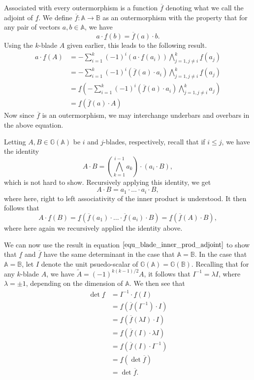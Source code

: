 \documentclass[12pt]{article}
\newcommand{\G}{\mathbb{G}}
\newcommand{\A}{\mathbb{A}}
\newcommand{\B}{\mathbb{B}}
\newcommand{\ob}{\overline}
\newcommand{\ub}{\underline}
\begin{document}
Associated with every outermorphism is a function $\ob{f}$ denoting what we call
the adjoint of $\ub{f}$.  We define $\ob{f}:\A\to\B$ as an outermorphism
with the property that for any pair of vectors $a,b\in\A$, we have
\begin{equation*}
a\cdot \ub{f}(b) = \ob{f}(a)\cdot b.
\end{equation*}
Using the $k$-blade $A$ given earlier, this leads to the following result.
\begin{align*}
a\cdot \ub{f}(A) &= -\sum_{i=1}^k(-1)^i(a\cdot\ub{f}(a_i))\bigwedge_{j=1,j\neq i}^k\ub{f}(a_j) \\
 &= -\sum_{i=1}^k(-1)^i(\ob{f}(a)\cdot a_i)\bigwedge_{j=1,j\neq i}^k\ub{f}(a_j) \\
 &= \ub{f}\left(-\sum_{i=1}^k(-1)^i(\ob{f}(a)\cdot a_i)\bigwedge_{j=1,j\neq i}^k a_j\right) \\
 &= \ub{f}(\ob{f}(a)\cdot A)
\end{align*}
Now since $\ob{f}$ is an outermorphism, we may interchange underbars and overbars
in the above equation.

Letting $A,B\in\G(\A)$ be $i$ and $j$-blades, respectively, recall that if $i\leq j$, we
have the identity
\begin{equation*}
A\cdot B = \left(\bigwedge_{k=1}^{i-1}a_k\right)\cdot(a_i\cdot B),
\end{equation*}
which is not hard to show.  Recursively applying this identity, we get
\begin{equation*}
A\cdot B = a_1\cdot\dots\cdot a_i\cdot B,
\end{equation*}
where here, right to left associativity of the inner product is understood.
It then follows that
\begin{equation}\label{equ_blade_inner_prod_adjoint}
A\cdot\ub{f}(B) = \ub{f}\left(\ob{f}(a_1)\cdot\dots\cdot\ob{f}(a_i)\cdot B\right) = \ub{f}(\ob{f}(A)\cdot B),
\end{equation}
where here again we recursively applied the identity above.

We can now use the
result in equation $\eqref{equ_blade_inner_prod_adjoint}$ to show that $\ub{f}$ and $\ob{f}$
have the same determinant in the case that $\A=\B$.  In the case that $\A=\B$, let $I$
denote the unit psuedo-scalar of $\G(\A)=\G(\B)$.  
Recalling that for any $k$-blade $A$, we have $\tilde{A}=(-1)^{k(k-1)/2}A$, it follows
that $I^{-1}=\lambda I$, where $\lambda = \pm 1$, depending on the dimension of $\A$.
We then see that
\begin{align*}
\det\ub{f} &= I^{-1}\cdot\ub{f}(I) \\
 &= \ub{f}(\ob{f}(I^{-1})\cdot I) \\
 &= \ub{f}(\ob{f}(\lambda I)\cdot I) \\
 &= \ub{f}(\ob{f}(I)\cdot\lambda I) \\
 &= \ub{f}(\ob{f}(I)\cdot I^{-1}) \\
 &= \ub{f}(\det\ob{f}) \\
 &= \det\ob{f}.
\end{align*}
\end{document}
